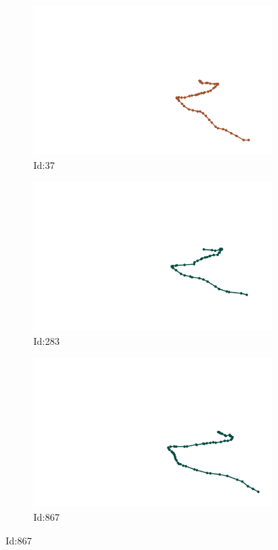 \documentclass[12pt,twoside]{report}
\begin{document}
\begin{figure}
\centering
\begin{subfigure}[b]{0.20\textwidth}
\centering
\includegraphics[width=\textwidth]{../../trajectories/37.png}
\caption{Id:37}
\end{subfigure}
\begin{subfigure}[b]{0.20\textwidth}
\centering
\includegraphics[width=\textwidth]{../../trajectories/283.png}
\caption{Id:283}
\end{subfigure}
\begin{subfigure}[b]{0.20\textwidth}
\centering
\includegraphics[width=\textwidth]{../../trajectories/867.png}
\caption{Id:867}
\end{subfigure}
\end{figure}
\end{document}
